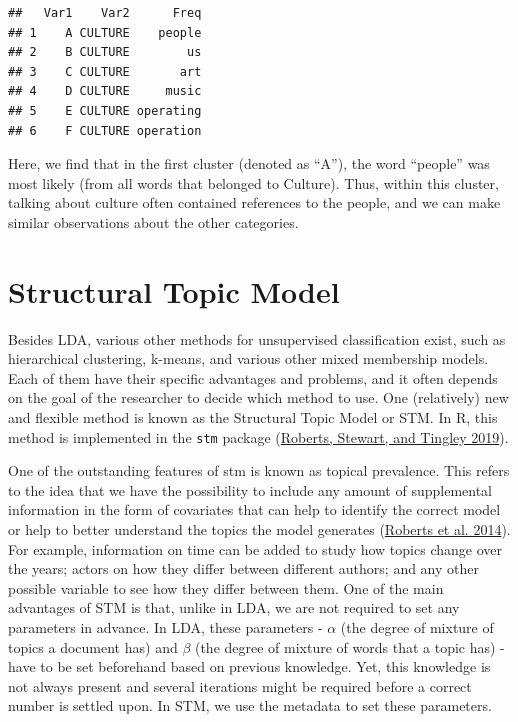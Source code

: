\documentclass[
]{book}
\begin{document}
\begin{verbatim}
##   Var1    Var2      Freq
## 1    A CULTURE    people
## 2    B CULTURE        us
## 3    C CULTURE       art
## 4    D CULTURE     music
## 5    E CULTURE operating
## 6    F CULTURE operation
\end{verbatim}

Here, we find that in the first cluster (denoted as ``A''), the word ``people'' was most likely (from all words that belonged to Culture). Thus, within this cluster, talking about culture often contained references to the people, and we can make similar observations about the other categories.

\hypertarget{structural-topic-model}{%
\section{Structural Topic Model}\label{structural-topic-model}}

Besides LDA, various other methods for unsupervised classification exist, such as hierarchical clustering, k-means, and various other mixed membership models. Each of them have their specific advantages and problems, and it often depends on the goal of the researcher to decide which method to use. One (relatively) new and flexible method is known as the Structural Topic Model or STM. In R, this method is implemented in the \texttt{stm} package (\protect\hyperlink{ref-Roberts2019a}{Roberts, Stewart, and Tingley 2019}).

One of the outstanding features of stm is known as topical prevalence. This refers to the idea that we have the possibility to include any amount of supplemental information in the form of covariates that can help to identify the correct model or help to better understand the topics the model generates (\protect\hyperlink{ref-Roberts2014a}{Roberts et al. 2014}). For example, information on time can be added to study how topics change over the years; actors on how they differ between different authors; and any other possible variable to see how they differ between them. One of the main advantages of STM is that, unlike in LDA, we are not required to set any parameters in advance. In LDA, these parameters - \(\alpha\) (the degree of mixture of topics a document has) and \(\beta\) (the degree of mixture of words that a topic has) - have to be set beforehand based on previous knowledge. Yet, this knowledge is not always present and several iterations might be required before a correct number is settled upon. In STM, we use the metadata to set these parameters.
\end{document}

